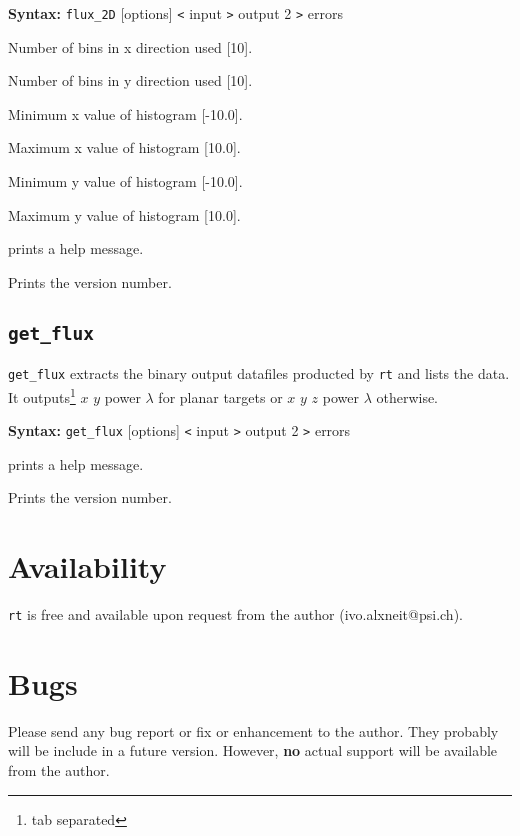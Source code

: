 \documentclass[10pt,a4paper,titlepage]{article}
\newcommand{\rt}{{\tt rt} }
\begin{document}
{\bf Syntax:} {\tt flux\_2D} [options] {\tt <} input {\tt >} output 2 {\tt >} errors
\vspace{1em}
\begin{list}{}
{\setlength{\leftmargin}{3.5cm}
\setlength{\labelwidth}{3.0cm}
\setlength{\labelsep}{0.25cm}
\setlength{\rightmargin}{0.5cm}}

\item[{\tt [--nx|-a]}] Number of bins in x direction used [10].
\item[{\tt [--ny|-b]}] Number of bins in y direction used [10].
\item[{\tt [--minx|-x]}] Minimum x value of histogram [-10.0].
\item[{\tt [--maxx|-X]}] Maximum x value of histogram [10.0].
\item[{\tt [--miny|-y]}] Minimum y value of histogram [-10.0].
\item[{\tt [--maxy|-Y]}] Maximum y value of histogram [10.0].
\item[{\tt [--help|-h]}] prints a help message.
\item[{\tt [--Version|-V]}] Prints the version number.

\end{list}

\subsection{{\tt get\_flux}}
{\tt get\_flux} extracts the binary output datafiles producted by {\tt rt} and lists the data. It outputs\footnote{tab separated} $x$ $y$ power $\lambda$ for planar targets or $x$ $y$ $z$ power $\lambda$ otherwise.

{\bf Syntax:} {\tt get\_flux} [options] {\tt <} input {\tt >} output 2 {\tt >} errors
\vspace{1em}
\begin{list}{}
{\setlength{\leftmargin}{3.5cm}
\setlength{\labelwidth}{3.0cm}
\setlength{\labelsep}{0.25cm}
\setlength{\rightmargin}{0.5cm}}

\item[{\tt [--help|-h]}] prints a help message.
\item[{\tt [--Version|-V]}] Prints the version number.

\end{list}


\section{Availability}
\rt is free and available upon request from the author (ivo.alxneit@psi.ch).



\section{Bugs} Please send any bug report or fix or enhancement to the author. They probably will be include in a future version. However, {\bf no} actual support will be available from the author.
\end{document}
